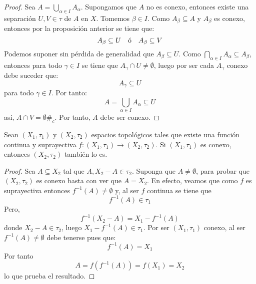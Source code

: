 \documentclass[12pt]{report}
\theoremstyle{largebreak}
\newcommand\cf[3]{\ensuremath{#1:#2\rightarrow#3}}
\newcommand\contradiction{\ensuremath{\#_c}}
\begin{document}
    \begin{proof}
        Sea $A=\bigcup_{\alpha\in I}A_\alpha$. Supongamos que $A$ no es conexo, entonces existe una separación $U,V\in\tau$ de $A$ en $X$. Tomemos $\beta\in I$. Como $A_\beta\subseteq A$ y $A_\beta$ es conexo, entonces por la proposición anterior se tiene que:
        \begin{equation*}
            A_\beta\subseteq U\quad\textup{ó}\quad A_\beta\subseteq V
        \end{equation*}
        Podemos suponer sin pérdida de generalidad que $A_\beta\subseteq U$. Como $\bigcap_{\alpha\in I}A_\alpha\subseteq A_\beta$, entonces para todo $\gamma\in I$ se tiene que $A_\gamma\cap U\neq\emptyset$, luego por ser cada $A_\gamma$ conexo debe suceder que:
        \begin{equation*}
            A_\gamma\subseteq U
        \end{equation*}
        para todo $\gamma\in I$. Por tanto:
        \begin{equation*}
            A=\bigcup_{\alpha\in I}A_\alpha\subseteq U
        \end{equation*}
        así, $A\cap V=\emptyset$\contradiction. Por tanto, $A$ debe ser conexo.
    \end{proof}

    \begin{propo}
        Sean $(X_1,\tau_1)$ y $(X_2,\tau_2)$ espacios topológicos tales que existe una función continua y suprayectiva $\cf{f}{(X_1,\tau_1)}{(X_2,\tau_2)}$. Si $(X_1,\tau_1)$ es conexo, entonces $(X_2,\tau_2)$ también lo es.
    \end{propo}

    \begin{proof}
        Sea $A\subseteq X_2$ tal que $A,X_2-A\in\tau_2$. Suponga que $A\neq\emptyset$, para probar que $(X_2,\tau_2)$ es conexo basta con ver que $A=X_2$. En efecto, veamos que como $f$ es suprayectiva entonces $f^{-1}(A)\neq\emptyset$ y, al ser $f$ continua se tiene que
        \begin{equation*}
            f^{-1}(A)\in\tau_1
        \end{equation*}
        Pero,
        \begin{equation*}
            f^{-1}(X_2-A)=X_1-f^{-1}(A)
        \end{equation*}
        donde $X_2-A\in\tau_2$, luego $X_1-f^{-1}(A)\in\tau_1$. Por ser $(X_1,\tau_1)$ conexo, al ser $f^{-1}(A)\neq\emptyset$ debe tenerse pues que:
        \begin{equation*}
            f^{-1}(A)=X_1
        \end{equation*}
        Por tanto
        \begin{equation*}
            A=f(f^{-1}(A))=f(X_1)=X_2
        \end{equation*}
        lo que prueba el resultado.
    \end{proof}
\end{document}
